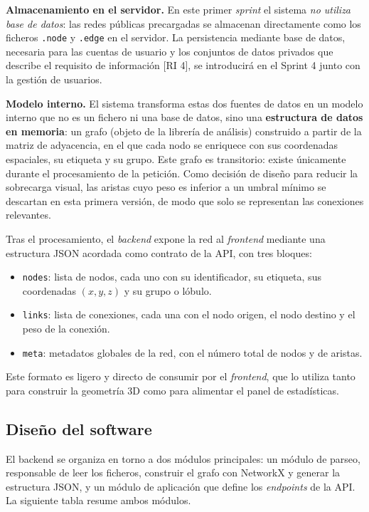 \textbf{Almacenamiento en el servidor.} En este primer \textit{sprint} el sistema \textit{no utiliza
base de datos}: las redes públicas precargadas se almacenan directamente como los ficheros
\texttt{.node} y \texttt{.edge} en el servidor. La persistencia mediante base de datos, necesaria
para las cuentas de usuario y los conjuntos de datos privados que describe el requisito de
información [RI 4], se introducirá en el Sprint 4 junto con la gestión de usuarios.

\textbf{Modelo interno.} El sistema transforma estas dos fuentes de datos en un modelo interno que no
es un fichero ni una base de datos, sino una \textbf{estructura de datos en memoria}: un grafo (objeto
de la librería de análisis) construido a partir de la matriz de adyacencia, en el que cada nodo se
enriquece con sus coordenadas espaciales, su etiqueta y su grupo. Este grafo es transitorio: existe
únicamente durante el procesamiento de la petición. Como decisión de diseño para reducir la sobrecarga
visual, las aristas cuyo peso es inferior a un umbral mínimo se descartan en esta primera versión, de
modo que solo se representan las conexiones relevantes.

Tras el procesamiento, el \textit{backend} expone la red al \textit{frontend} mediante una estructura
JSON acordada como contrato de la API, con tres bloques:
\begin{itemize}
	\item \texttt{nodes}: lista de nodos, cada uno con su identificador, su etiqueta, sus coordenadas
		$(x, y, z)$ y su grupo o lóbulo.
	\item \texttt{links}: lista de conexiones, cada una con el nodo origen, el nodo destino y el peso
		de la conexión.
	\item \texttt{meta}: metadatos globales de la red, con el número total de nodos y de aristas.
\end{itemize}
Este formato es ligero y directo de consumir por el \textit{frontend}, que lo utiliza tanto para
construir la geometría 3D como para alimentar el panel de estadísticas.

\subsection{Diseño del software}

El backend se organiza en torno a dos módulos principales: un módulo de parseo, responsable de
leer los ficheros, construir el grafo con NetworkX y generar la estructura JSON, y un módulo de
aplicación que define los \textit{endpoints} de la API. La siguiente tabla resume ambos módulos.

